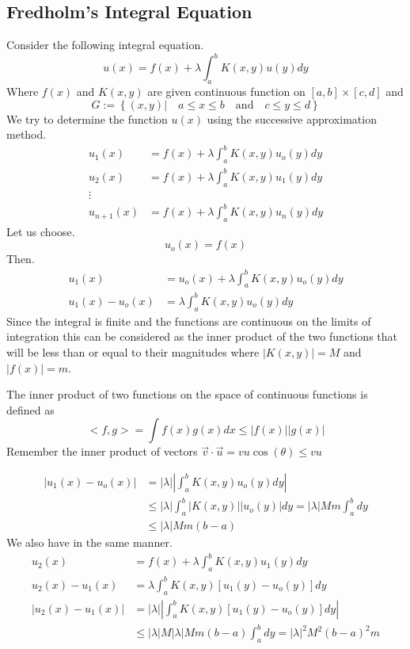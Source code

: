 \documentclass[]{article}
\begin{document}
\subsection{Fredholm's Integral Equation}
Consider the following integral equation.
\[
u(x) = f(x) + \lambda\int_{a}^{b} K(x,y) u(y)dy    
\]
Where $f(x)$ and $K(x,y)$ are given continuous function on $[a,b]\times[c,d]$ and
\[
    G := \left\{ (x,y) | \quad a\leq x\leq b \quad \text{and} \quad c\leq y\leq d \right\}
\]
We try to determine the function $u(x)$ using the successive approximation method.
\begin{align*}
u_1(x) &= f(x) + \lambda\int_{a}^{b} K(x,y) u_o(y)dy
\\
u_2(x) &= f(x) + \lambda\int_{a}^{b} K(x,y) u_1(y)dy
\\
\vdots
\\
u_{n+1}(x) &= f(x) + \lambda\int_{a}^{b} K(x,y) u_n(y)dy
\end{align*}
Let us choose.
\[
u_o(x) = f(x)    
\]
Then.
\begin{align*}
u_1(x) &= u_o(x) + \lambda\int_{a}^{b} K(x,y) u_o(y)dy
\\
u_1(x)- u_o(x) &= \lambda\int_{a}^{b} K(x,y) u_o(y)dy
\end{align*}
Since the integral is finite and the functions are continuous on the limits of integration 
this can be considered as the inner product of the two functions 
that will be less than or equal to their magnitudes where $|K(x,y)| = M$ and $|f(x)| = m$.
\begin{enrichment*}{}
    The inner product of two functions on the space of continuous functions is defined as 
    \[
        <f,g> = \int f(x)g(x)dx \leq |f(x)||g(x)|
    \]
    Remember the inner product of vectors $\vec{v}\cdot \vec{u} = vu \cos(\theta) \leq vu$
\end{enrichment*}
\begin{align*}
    \left|u_1(x)- u_o(x)\right| &= |\lambda|\left|\int_{a}^{b} K(x,y) u_o(y)dy\right|    
    \\
    & \leq |\lambda|\int_{a}^{b}|K(x,y)||u_o(y)|dy = |\lambda|Mm\int_{a}^{b}dy
    \\
    & \leq |\lambda|Mm(b-a)
\end{align*}
We also have in the same manner. 
\begin{align*}
u_2(x) &= f(x) + \lambda\int_{a}^{b} K(x,y) u_1(y)dy
\\
u_2(x) - u_1(x)&= \lambda\int_{a}^{b} K(x,y) [u_1(y)-u_o(y)]dy
\\
|u_2(x) - u_1(x)| &= |\lambda|\left|\int_{a}^{b} K(x,y) [u_1(y)-u_o(y)]dy\right| 
\\
&\leq |\lambda|M |\lambda|Mm(b-a) \int_{a}^{b}dy = |\lambda|^2M^2{(b-a)}^2 m
\end{align*}
\end{document}

